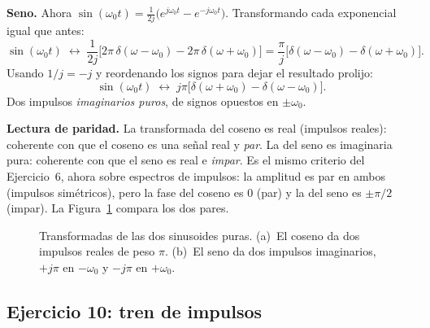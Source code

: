 \documentclass[10pt,a4paper]{article}
\begin{document}
	\textbf{Seno.} Ahora $\sin(\omega_0 t)=\tfrac{1}{2j}\big(e^{j\omega_0 t}-e^{-j\omega_0 t}\big)$. Transformando cada exponencial igual que antes:
	\[
		\sin(\omega_0 t) \;\leftrightarrow\; \frac{1}{2j}\big[2\pi\,\delta(\omega-\omega_0) - 2\pi\,\delta(\omega+\omega_0)\big]
		= \frac{\pi}{j}\big[\delta(\omega-\omega_0) - \delta(\omega+\omega_0)\big].
	\]
	Usando $1/j=-j$ y reordenando los signos para dejar el resultado prolijo:
	\[
		\boxed{\sin(\omega_0 t) \;\leftrightarrow\; j\pi\big[\delta(\omega+\omega_0)-\delta(\omega-\omega_0)\big].}
	\]
	Dos impulsos \emph{imaginarios puros}, de signos opuestos en $\pm\omega_0$.

	\textbf{Lectura de paridad.} La transformada del coseno es real (impulsos reales): coherente con que el coseno es una señal real y \emph{par}. La del seno es imaginaria pura: coherente con que el seno es real e \emph{impar}. Es el mismo criterio del Ejercicio~6, ahora sobre espectros de impulsos: la amplitud es par en ambos (impulsos simétricos), pero la fase del coseno es $0$ (par) y la del seno es $\pm\pi/2$ (impar). La Figura~\ref{fig:sol_ej10} compara los dos pares.

	\begin{figure}[H]
		\centering
		
		\caption{Transformadas de las dos sinusoides puras. (a)~El coseno da dos impulsos reales de peso $\pi$. (b)~El seno da dos impulsos imaginarios, $+j\pi$ en $-\omega_0$ y $-j\pi$ en $+\omega_0$.}
		\label{fig:sol_ej10}
	\end{figure}

	\subsection*{Ejercicio 10: tren de impulsos}
\end{document}

